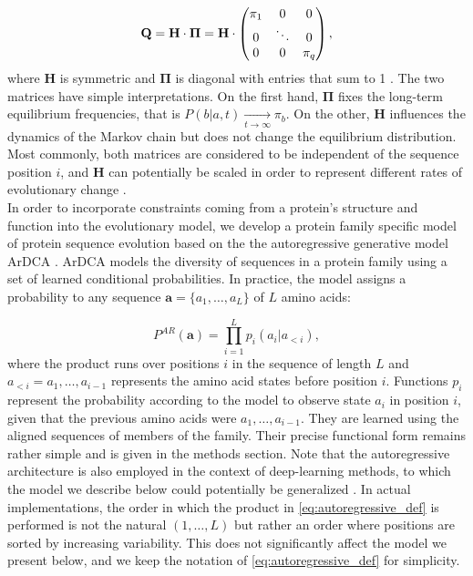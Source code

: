 \begin{equation}
	\label{eq:Q_decomposition}
	\mathbf{Q} = \mathbf{H}\cdot \mathbf{\Pi} = \mathbf{H} \cdot \begin{pmatrix}
		\pi_1 & 0 & 0\\ 
		0 & \ddots & 0 \\
		0 & 0 & \pi_q
	\end{pmatrix},
\end{equation}
where $\mathbf{H}$ is symmetric and $\mathbf{\Pi}$ is diagonal with entries that sum to 1 \cite{yang_computationalmolecularevolution_2006}. 
The two matrices have simple interpretations. 
On the first hand, $\mathbf{\Pi}$ fixes the long-term equilibrium frequencies, that is $P(b \vert a, t) \xrightarrow[t \rightarrow \infty]{} \pi_b$.
On the other, $\mathbf{H}$ influences the dynamics of the Markov chain but does not change the equilibrium distribution. 
Most commonly, both matrices are considered to be independent of the sequence position $i$, and $\mathbf{H}$ can potentially be scaled in order to represent different rates of evolutionary change \cite{yang_maximumlikelihoodphylogenetic_1994}. \\


In order to incorporate constraints coming from a protein's structure and function into the evolutionary model, we develop a protein family specific model of protein sequence evolution based on the the autoregressive generative model ArDCA \cite{trinquier_efficientgenerativemodeling_2021}. 
ArDCA models the diversity of sequences in a protein family using a set of learned conditional probabilities. 
In practice, the model assigns a probability to any sequence $\mathbf{a} = \{a_1, \ldots, a_L\}$ of $L$ amino acids: 

\begin{equation}
	\label{eq:autoregressive_def}
	P^{AR}(\mathbf{a}) = \prod_{i=1}^L p_i(a_i \vert a_{<i}),
\end{equation}
where the product runs over positions $i$ in the sequence of length $L$ and $a_{<i} = a_1, \ldots, a_{i-1}$ represents the amino acid states before position $i$. 
Functions $p_i$ represent the probability according to the model to observe state $a_i$ in position $i$, given that the previous amino acids were $a_1, \ldots, a_{i-1}$. 
They are learned using the aligned sequences of members of the family.
Their precise functional form remains rather simple and is given in the methods section. 
Note that the autoregressive architecture is also employed in the context of deep-learning methods, to which the model we describe below could potentially be generalized \cite{ferruz_protgpt2deepunsupervised_2022}.
In actual implementations, the order in which the product in \eqref{eq:autoregressive_def} is performed is not the natural $(1, \ldots, L)$ but rather an order where positions are sorted by increasing variability.
This does not significantly affect the model we present below, and we keep the notation of \eqref{eq:autoregressive_def} for simplicity. 


